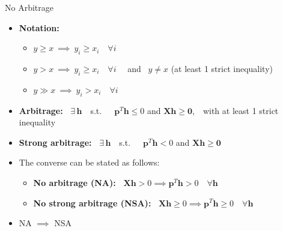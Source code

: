 \documentclass[aspectratio=1610]{beamer}
\newcommand{\st}{s.t.\ }
\begin{document}
\begin{frame}{No Arbitrage}
\begin{itemize}
  \item {\bf Notation:}
  \begin{itemize}
    \item $y \geq x\ \implies\ y_i \geq x_i \quad \forall i$
    \item $y > x\ \implies\ y_i \geq x_i \quad \forall i$ \ \ and \ $y\neq x$ (at least 1 strict inequality)
    \item $y \gg x\ \implies\ y_i > x_i \quad \forall i$
  \end{itemize}
  \vspace{2ex}

  \item {\bf Arbitrage:\ } $\exists\, \bm h$\ \ \st \ \ $\bm p^T\bm h \leq 0$ and $\bm{Xh}\geq \bm 0$,\ \ with at least 1 strict inequality

  \item {\bf Strong arbitrage:\ } $\exists\, \bm h$\ \ \st \ \ $\bm p^T\bm h < 0$ and $\bm{Xh}\geq \bm 0$

  \item The converse can be stated as follows:
  \begin{itemize}
    \item {\bf No arbitrage (NA):\ } $\bm{Xh}>0 \implies \bm p^T\bm h > 0 \quad \forall \bm h$
    \item {\bf No strong arbitrage (NSA):\ } $\bm{Xh}\geq 0 \implies \bm p^T\bm h \geq 0 \quad \forall \bm h$
  \end{itemize}
  \vspace{2ex}

  \item NA $\implies$ NSA
\end{itemize}
\end{frame}
\end{document}
